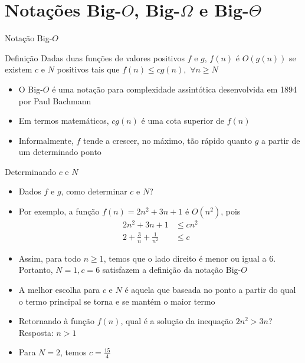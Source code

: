 \section{Notações Big-$O$, Big-$\Omega$ e Big-$\Theta$}

\begin{frame}[fragile]{Notação Big-$O$}

    \begin{block}{Definição}
		Dadas duas funções de {valores positivos} $f$ e 
		$g$, $f(n)$ é $O(g(n))$ se existem $c$ e $N$ positivos tais que
		$f(n) \leq cg(n),\, \, \forall n\geq N$
    \end{block}

	\begin{itemize}
		\item O Big-$O$ é uma notação para complexidade 
		assintótica desenvolvida em 1894 por Paul Bachmann

		\item Em termos matemáticos, $cg(n)$ é uma cota superior de $f(n)$

		\item Informalmente, $f$ tende a crescer, no máximo, tão rápido quanto $g$ a partir de um 
        determinado ponto
	\end{itemize}

\end{frame}

\begin{frame}[fragile]{Determinando $c$ e $N$}

    \begin{itemize}
    \item Dados $f$ e $g$, como {determinar} $c$ e $N$?

    \item Por exemplo, a função $f(n) = 2n^2 + 3n + 1$ {é} $O(n^2)$, pois
    \begin{align*}
    2n^2 + 3n + 1 & \leq cn^2 \\
    2 + \frac{3}{n} + \frac{1}{n^2} & \leq c
    \end{align*}

	\item Assim, para todo $n \geq 1$, temos que o lado direito é menor ou igual a 6. Portanto,
    $N = 1, c = 6$ satisfazem a definição da notação Big-$O$

    \item A melhor escolha para $c$ e $N$ é aquela que baseada no ponto a partir do qual o termo 
    principal se torna e se mantém o maior termo

    \item Retornando à função $f(n)$, qual é a solução da inequação $2n^2 > 3n$? Resposta: $n > 1$

    \item Para $N = 2$, temos $c = \frac{15}{4}$
	\end{itemize}

\end{frame}

